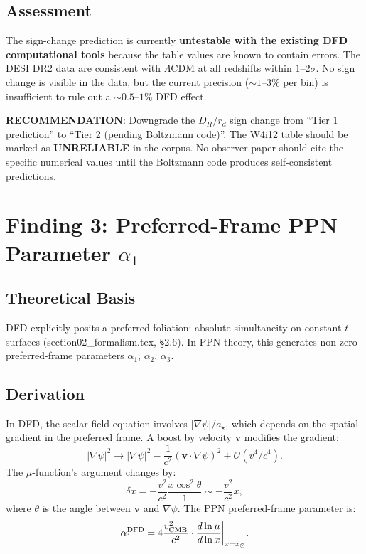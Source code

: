 \documentclass[11pt]{article}
\newcommand{\order}[1]{\mathcal{O}(#1)}
\newcommand{\LCDM}{$\Lambda$CDM}
\begin{document}
\subsection{Assessment}

The sign-change prediction is currently \textbf{untestable with the
existing DFD computational tools} because the table values are known to
contain errors.  The DESI DR2 data are consistent with \LCDM{} at all
redshifts within $1$--$2\sigma$.  No sign change is visible in the
data, but the current precision ($\sim 1$--$3\%$ per bin) is
insufficient to rule out a $\sim 0.5$--$1\%$ DFD effect.

\begin{tcolorbox}[colback=orange!10, colframe=orange!70!black]
\textbf{RECOMMENDATION}: Downgrade the $D_H/r_d$ sign change from
``Tier 1 prediction'' to ``Tier 2 (pending Boltzmann code)''.  The
W4i12 table should be marked as \textbf{UNRELIABLE} in the corpus.
No observer paper should cite the specific numerical values until
the Boltzmann code produces self-consistent predictions.
\end{tcolorbox}


\section{Finding 3: Preferred-Frame PPN Parameter $\alpha_1$}
\label{sec:PPN}

\subsection{Theoretical Basis}

DFD explicitly posits a preferred foliation: absolute simultaneity on
constant-$t$ surfaces (section02\_formalism.tex, \S2.6).  In PPN
theory, this generates non-zero preferred-frame parameters $\alpha_1$,
$\alpha_2$, $\alpha_3$.

\subsection{Derivation}

In DFD, the scalar field equation involves $|\nabla\psi|/a_\star$, which
depends on the spatial gradient in the preferred frame.  A boost by
velocity $\mathbf{v}$ modifies the gradient:
\begin{equation}
|\nabla\psi|^2 \to |\nabla\psi|^2 - \frac{1}{c^2}
(\mathbf{v}\cdot\nabla\psi)^2 + \order{v^4/c^4}.
\end{equation}
The $\mu$-function's argument changes by:
\begin{equation}
\delta x = -\frac{v^2}{c^2}\frac{x\cos^2\theta}{1}
\sim -\frac{v^2}{c^2}x,
\end{equation}
where $\theta$ is the angle between $\mathbf{v}$ and $\nabla\psi$.
The PPN preferred-frame parameter is:
\begin{equation}
\alpha_1^{\rm DFD} = 4\frac{v_{\rm CMB}^2}{c^2}
\cdot \frac{d\ln\mu}{d\ln x}\bigg|_{x = x_\odot}.
\end{equation}
\end{document}

